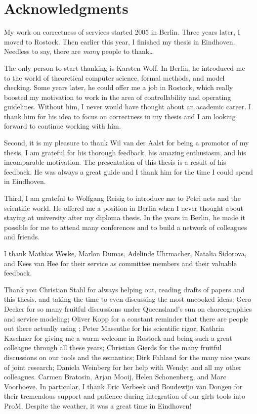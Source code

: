 \chapter*{Acknowledgments}

My work on correctness of services started 2005 in Berlin. Three years later, I moved to Rostock. Then earlier this year, I finished my thesis in Eindhoven. Needless to say, there are \emph{many} people to thank\dots\medskip

The only person to start thanking is Karsten Wolf. In Berlin, he introduced me to the world of theoretical computer science, formal methods, and model checking. Some years later, he could offer me a job in Rostock, which really boosted my motivation to work in the area of controllability and operating guidelines. Without him, I never would have thought about an academic career. I thank him for his idea to focus on correctness in my thesis and I am looking forward to continue working with him.

Second, it is my pleasure to thank Wil van der Aalst for being a promotor of my thesis. I am grateful for his thorough feedback, his amazing enthusiasm, and his incomparable motivation. The presentation of this thesis is a result of his feedback. He was always a great guide and I thank him for the time I could spend in Eindhoven.

Third, I am grateful to Wolfgang Reisig to introduce me to Petri nets and the scientific world. He offered me a position in Berlin when I never thought about staying at university after my diploma thesis. In the years in Berlin, he made it possible for me to attend many conferences and to build a network of colleagues and friends.

I thank Mathias Weske, Marlon Dumas, Adelinde Uhrmacher, Natalia Sidorova, and Kees van Hee for their service as committee members and their valuable feedback.

Thank you Christian Stahl for always helping out, reading drafts of papers and this thesis, and taking the time to even discussing the most uncooked ideas; Gero Decker for so many fruitful discussions under Queensland's sun on choreographies and service modeling; Oliver Kopp for a constant reminder that there are people out there actually using ; Peter Massuthe for his scientific rigor; Kathrin Kaschner for giving me a warm welcome in Rostock and being such a great colleague through all these years; Christian Gierds for the many fruitful discussions on our tools and the  semantics; Dirk Fahland for the many nice years of joint research; Daniela Weinberg for her help with Wendy; and all my other colleagues. Carmen Bratosin, Arjan Mooij, Helen Schonenberg, and Marc Voorhoeve. In particular, I thank Eric Verbeek and Boudewijn van Dongen for their tremendous support and patience during integration of our \st{girls} tools into ProM. Despite the weather, it was a great time in Eindhoven!

